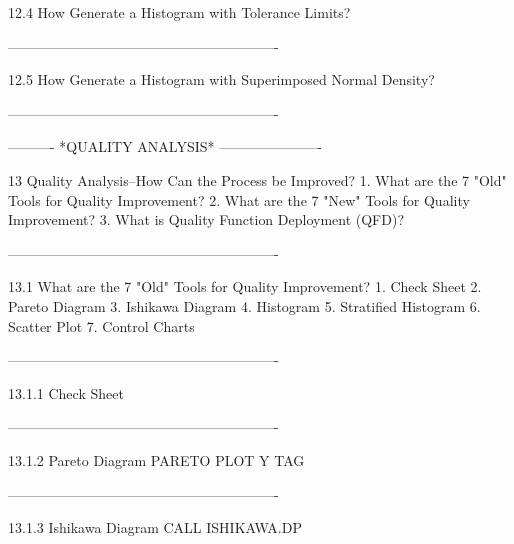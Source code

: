 12.4
How Generate a Histogram with Tolerance Limits?
 
----------------------------------------------------------
 
12.5
How Generate a Histogram with Superimposed Normal Density?
 
----------------------------------------------------------
 
 
 
 
 
 
 
 
 
 
 
 
 
 
 
 
 
 
 
 
 
 
 
 
 
 
 
 
 
 
 
 
 
 
 
 
 
 
 
 
 
 
 
 
 
 
----------  *QUALITY ANALYSIS*  ----------------------
 
13
Quality Analysis--How Can the Process be Improved?
   1. What are the 7 "Old" Tools for Quality Improvement?
   2. What are the 7 "New" Tools for Quality Improvement?
   3. What is Quality Function Deployment (QFD)?
 
----------------------------------------------------------
 
13.1
What are the 7 "Old" Tools for Quality Improvement?
   1. Check Sheet
   2. Pareto Diagram
   3. Ishikawa Diagram
   4. Histogram
   5. Stratified Histogram
   6. Scatter Plot
   7. Control Charts
 
----------------------------------------------------------
 
13.1.1
Check Sheet
 
----------------------------------------------------------
 
13.1.2
Pareto Diagram
      PARETO PLOT Y TAG
 
----------------------------------------------------------
 
13.1.3
Ishikawa Diagram
      CALL ISHIKAWA.DP
 
